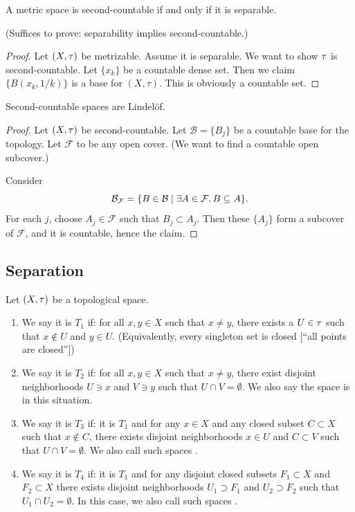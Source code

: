 \begin{theorem}
A metric space is second-countable if and only if it is separable.
\end{theorem}
(Suffices to prove: separability implies second-countable.)

\begin{proof}
Let $(X,\topology)$ be metrizable. Assume it is separable. We want to
show $\topology$ is second-countable. Let $\{x_{k}\}$ be a countable
dense set. Then we claim $\{B(x_{k},1/k)\}$ is a base for
$(X,\tau)$. This is obviously a countable set.
\end{proof}

\begin{theorem}\label{thm:math110a:fall:second-countable-spaces-are-lindelof}
Second-countable spaces are Lindel\"{o}f.
\end{theorem}

\begin{proof}
Let $(X,\topology)$ be second-countable. Let $\mathcal{B}=\{B_{j}\}$ be a
countable base for the topology. Let $\mathcal{F}$ to be any open
cover. (We want to find a countable open subcover.)

Consider
\begin{equation}
\mathcal{B}_{\mathcal{F}}=\{B\in\mathcal{B}\mid\exists A\in\mathcal{F}\ldotp B\subset A\}.
\end{equation}
For each $j$, choose $A_{j}\in\mathcal{F}$ such that $B_{j}\subset A_{j}$.
Then these $\{A_{j}\}$ form a subcover of $\mathcal{F}$, and it is
countable, hence the claim.
\end{proof}

\subsection{Separation}

\begin{definition}
Let $(X,\topology)$ be a topological space.
\begin{enumerate}
\item We say it is $T_{1}$ if: for all $x,y\in X$ such that $x\neq y$,
  there exists a $U\in\topology$ such that $x\notin U$ and $y\in U$.
  (Equivalently, every singleton set is closed [``all points are closed''])
\item We say it is $T_{2}$ if: for all $x,y\in X$ such that $x\neq y$,
  there exist disjoint neighborhoods $U\ni x$ and $V\ni y$ such that
  $U\cap V=\emptyset$. We also say the space is  in
  this situation.
\item We say it is $T_{3}$ if: it is $T_{1}$ and for any $x\in X$ and
  any closed subset $C\subset X$ such that $x\notin C$, there exists
  disjoint neighborhoods $x\in U$ and $C\subset V$ such that $U\cap V=\emptyset$.
  We also call such spaces .
\item We say it is $T_{4}$ if: it is $T_{1}$ and for any disjoint
  closed subsets $F_{1}\subset X$ and $F_{2}\subset X$ there exists
  disjoint neighborhoods $U_{1}\supset F_{1}$ and $U_{2}\supset F_{2}$
  such that $U_{1}\cap U_{2}=\emptyset$. In this case, we also call
  such spaces .
\end{enumerate}
\end{definition}

